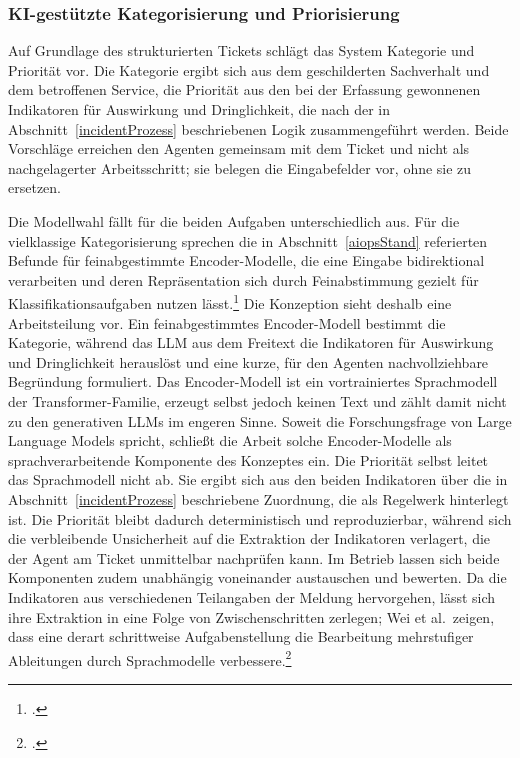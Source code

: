 \subsubsection{KI-gestützte Kategorisierung und Priorisierung}
\label{kategorisierungSoll}

Auf Grundlage des strukturierten Tickets schl\"agt das System Kategorie und Priorit\"at vor. Die Kategorie ergibt sich aus dem geschilderten Sachverhalt und dem betroffenen Service, die Priorit\"at aus den bei der Erfassung gewonnenen Indikatoren f\"ur Auswirkung und Dringlichkeit, die nach der in Abschnitt~\ref{incidentProzess} beschriebenen Logik zusammengef\"uhrt werden. Beide Vorschl\"age erreichen den Agenten gemeinsam mit dem Ticket und nicht als nachgelagerter Arbeitsschritt; sie belegen die Eingabefelder vor, ohne sie zu ersetzen.

Die Modellwahl f\"allt f\"ur die beiden Aufgaben unterschiedlich aus. F\"ur die vielklassige Kategorisierung sprechen die in Abschnitt~\ref{aiopsStand} referierten Befunde f\"ur feinabgestimmte Encoder-Modelle, die eine Eingabe bidirektional verarbeiten und deren Repr\"asentation sich durch Feinabstimmung gezielt f\"ur Klassifikationsaufgaben nutzen l\"asst.\footcites[Vgl.][S.~4171 und 4173]{Devlin2019}[][S.~27]{RazmaJurkus2026} Die Konzeption sieht deshalb eine Arbeitsteilung vor. Ein feinabgestimmtes Encoder-Modell bestimmt die Kategorie, w\"ahrend das LLM aus dem Freitext die Indikatoren f\"ur Auswirkung und Dringlichkeit herausl\"ost und eine kurze, f\"ur den Agenten nachvollziehbare Begr\"undung formuliert. Das Encoder-Modell ist ein vortrainiertes Sprachmodell der Transformer-Familie, erzeugt selbst jedoch keinen Text und z\"ahlt damit nicht zu den generativen LLMs im engeren Sinne. Soweit die Forschungsfrage von Large Language Models spricht, schlie{\ss}t die Arbeit solche Encoder-Modelle als sprachverarbeitende Komponente des Konzeptes ein. Die Priorit\"at selbst leitet das Sprachmodell nicht ab. Sie ergibt sich aus den beiden Indikatoren \"uber die in Abschnitt~\ref{incidentProzess} beschriebene Zuordnung, die als Regelwerk hinterlegt ist. Die Priorit\"at bleibt dadurch deterministisch und reproduzierbar, w\"ahrend sich die verbleibende Unsicherheit auf die Extraktion der Indikatoren verlagert, die der Agent am Ticket unmittelbar nachpr\"ufen kann. Im Betrieb lassen sich beide Komponenten zudem unabh\"angig voneinander austauschen und bewerten. Da die Indikatoren aus verschiedenen Teilangaben der Meldung hervorgehen, l\"asst sich ihre Extraktion in eine Folge von Zwischenschritten zerlegen; Wei et al.~zeigen, dass eine derart schrittweise Aufgabenstellung die Bearbeitung mehrstufiger Ableitungen durch Sprachmodelle verbessere.\footcite[Vgl.][hier S.~24824--24826]{Wei2022}

